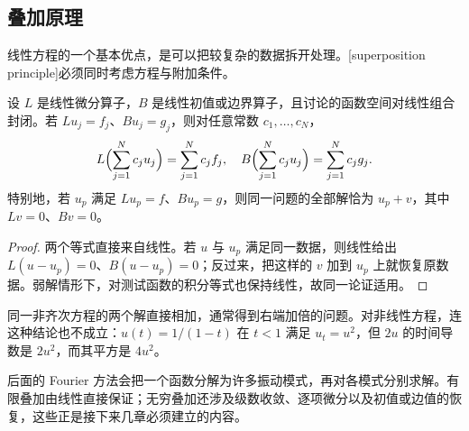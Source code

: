 \subsection{叠加原理}
\label{b2:subsec:010406}

线性方程的一个基本优点，是可以把较复杂的数据拆开处理。[superposition principle]必须同时考虑方程与附加条件。

\begin{proposition}\label{b2:prop:01-superposition}
设 \(L\) 是线性微分算子，\(B\) 是线性初值或边界算子，且讨论的函数空间对线性组合封闭。若 \(Lu_j=f_j\)、\(Bu_j=g_j\)，则对任意常数 \(c_1,\ldots,c_N\)，
\[
L\Bigl(\sum_{j=1}^N c_ju_j\Bigr)=\sum_{j=1}^N c_jf_j,
\quad
B\Bigl(\sum_{j=1}^N c_ju_j\Bigr)=\sum_{j=1}^N c_jg_j.
\]
特别地，若 \(u_p\) 满足 \(Lu_p=f\)、\(Bu_p=g\)，则同一问题的全部解恰为 \(u_p+v\)，其中 \(Lv=0\)、\(Bv=0\)。
\end{proposition}
\begin{proof}
两个等式直接来自线性。若 \(u\) 与 \(u_p\) 满足同一数据，则线性给出 \(L(u-u_p)=0\)、\(B(u-u_p)=0\)；反过来，把这样的 \(v\) 加到 \(u_p\) 上就恢复原数据。弱解情形下，对测试函数的积分等式也保持线性，故同一论证适用。
\end{proof}

同一非齐次方程的两个解直接相加，通常得到右端加倍的问题。对非线性方程，连这种结论也不成立：\(u(t)=1/(1-t)\) 在 \(t<1\) 满足 \(u_t=u^2\)，但 \(2u\) 的时间导数是 \(2u^2\)，而其平方是 \(4u^2\)。

\ProseParagraphBreak

后面的 Fourier 方法会把一个函数分解为许多振动模式，再对各模式分别求解。有限叠加由线性直接保证；无穷叠加还涉及级数收敛、逐项微分以及初值或边值的恢复，这些正是接下来几章必须建立的内容。

